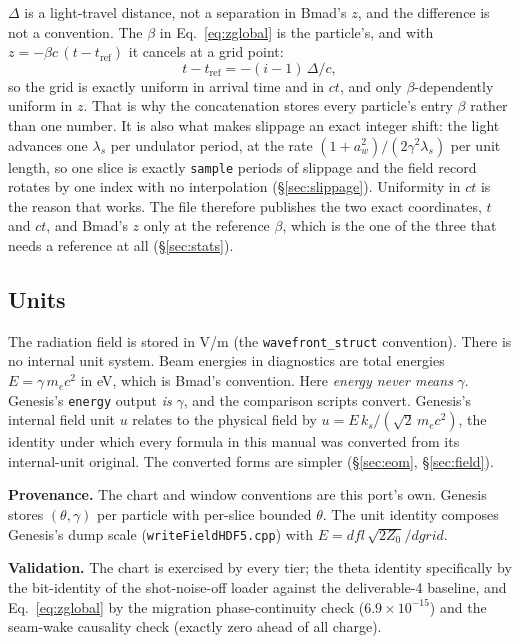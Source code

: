 \documentclass[11pt]{article}
\newcommand{\code}[1]{\texttt{#1}}
\newenvironment{provenance}{\par\small\textbf{Provenance.}}{\par}
\newenvironment{validation}{\par\small\textbf{Validation.}}{\par}
\begin{document}
$\Delta$ is a light-travel distance, not a separation in Bmad's $z$, and the difference
is not a convention. The $\beta$ in Eq.~\ref{eq:zglobal} is the particle's, and with
$z = -\beta c\,(t - t_{\mathrm{ref}})$ it cancels at a grid point:
\begin{equation}\label{eq:tslice}
  t - t_{\mathrm{ref}} = -(i-1)\,\Delta/c ,
\end{equation}
so the grid is exactly uniform in arrival time and in $ct$, and only $\beta$-dependently
uniform in $z$. That is why the concatenation stores every particle's entry $\beta$
rather than one number. It is also what makes slippage an exact integer shift: the light
advances one $\lambda_s$ per undulator period, at the rate
$(1+a_w^2)/(2\gamma^2\lambda_s)$ per unit length, so one slice is exactly \code{sample}
periods of slippage and the field record rotates by one index with no interpolation
(\S\ref{sec:slippage}). Uniformity in $ct$ is the reason that works. The file therefore
publishes the two exact coordinates, $t$ and $ct$, and Bmad's $z$ only at the reference
$\beta$, which is the one of the three that needs a reference at all
(\S\ref{sec:stats}).

\subsection{Units}\label{sec:units}

The radiation field is stored in V/m (the \code{wavefront\_struct} convention). There
is no internal unit system. Beam energies in diagnostics are total energies
$E = \gamma\, m_e c^2$ in eV, which is Bmad's convention. Here \emph{energy never
means} $\gamma$. Genesis's \code{energy} output \emph{is} $\gamma$, and the comparison
scripts convert. Genesis's internal field unit $u$ relates to the physical field by
$u = E\,k_s/(\sqrt2\, m_e c^2)$, the identity under which every formula in this manual
was converted from its internal-unit original. The converted forms are simpler
(\S\ref{sec:eom}, \S\ref{sec:field}).

\begin{provenance}
The chart and window conventions are this port's own.
Genesis stores $(\theta,\gamma)$ per particle with per-slice bounded $\theta$. The
unit identity composes Genesis's dump scale (\code{writeFieldHDF5.cpp}) with
$E = \mathit{dfl}\,\sqrt{2 Z_0}/\mathit{dgrid}$.
\end{provenance}
\begin{validation}
The chart is exercised by every tier; the theta identity specifically by the
bit-identity of the shot-noise-off loader against the deliverable-4 baseline, and
Eq.~\ref{eq:zglobal} by the migration phase-continuity check ($6.9\times10^{-15}$) and
the seam-wake causality check (exactly zero ahead of all charge).
\end{validation}
\end{document}
